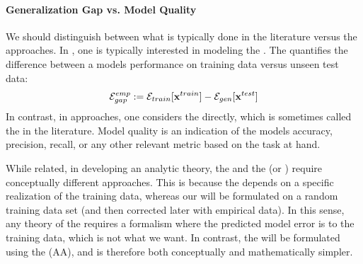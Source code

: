 
\paragraph{Generalization Gap vs. Model Quality}
\label{sxn:SMOG_main-model_quality}

We should distinguish between what is typically done in the \SLT literature versus the \STATMECH approaches.
In \SLT, one is typically interested in modeling the \emph{\GeneralizationGap}.
The \GeneralizationGap quantifies the difference between a models performance on training data versus unseen test data:
\begin{align}
  \label{eqn:gen_gap}
  \mathcal{E}^{emp}_{gap}:= {\mathcal{E}}_{train}[\mathbf{x}^{train}]- {\mathcal{E}}_{gen}[\mathbf{x}^{test}]
\end{align}
In contrast, in \STATMECH approaches, one considers the \ModelGeneralizationError directly,
which is sometimes called the \ModelQuality in the \SLT literature.
Model quality is an indication of the models accuracy, precision, recall, or any other relevant metric based on the task at hand.

While related, in developing an analytic theory, the \GeneralizationGap and
the \ModelQuality (or \ModelGeneralizationError) require conceptually different approaches.
This is because the  \GeneralizationGap depends on a specific realization of the training data,
whereas our \ModelGeneralizationError will be formulated on a random training data set
(and then corrected later with empirical data).
In this sense, any theory of the \GeneralizationGap  requires a formalism where the
predicted model error is \Quenched to the training data, which is not what we want.
In contrast, the \ModelGeneralizationError  will be formulated using the \AnnealedApproximation (AA),
and is therefore both conceptually and mathematically simpler.


